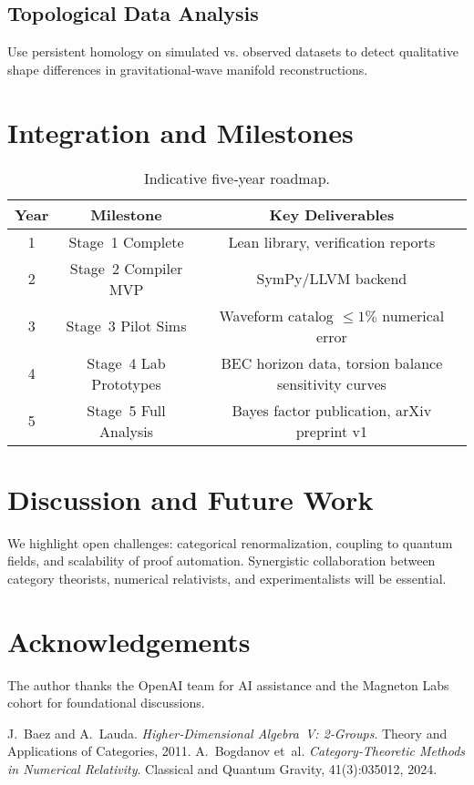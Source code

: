 \documentclass[11pt]{article}
\begin{document}
\subsection{Topological Data Analysis}
Use persistent homology on simulated vs. observed datasets to detect qualitative shape differences in gravitational‑wave manifold reconstructions.

\section{Integration and Milestones}
\begin{table}[h]
  \centering
  \begin{tabular}{|c|c|c|}
    \hline
    Year & Milestone & Key Deliverables \\
    \hline
    1 & Stage 1 Complete & Lean library, verification reports \\
    2 & Stage 2 Compiler MVP & SymPy/LLVM backend \\
    3 & Stage 3 Pilot Sims & Waveform catalog \(\le1\%\) numerical error \\
    4 & Stage 4 Lab Prototypes & BEC horizon data, torsion balance sensitivity curves \\
    5 & Stage 5 Full Analysis & Bayes factor publication, arXiv preprint v1 \\
    \hline
  \end{tabular}
  \caption{Indicative five‑year roadmap.}
\end{table}

\section{Discussion and Future Work}
We highlight open challenges: categorical renormalization, coupling to quantum fields, and scalability of proof automation. Synergistic collaboration between category theorists, numerical relativists, and experimentalists will be essential.

\section*{Acknowledgements}
The author thanks the OpenAI team for AI assistance and the Magneton Labs cohort for foundational discussions.


\begin{thebibliography}{10}
 J.~Baez and A.~Lauda. \emph{Higher‑Dimensional Algebra V: 2‑Groups}. Theory and Applications of Categories, 2011.
 A.~Bogdanov et~al. \emph{Category‑Theoretic Methods in Numerical Relativity}. Classical and Quantum Gravity, 41(3):035012, 2024.
\end{thebibliography}
\end{document}
